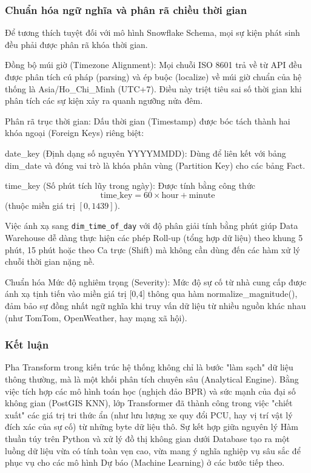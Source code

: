 \subsubsection{Chuẩn hóa ngữ nghĩa và phân rã chiều thời gian}
Để tương thích tuyệt đối với mô hình Snowflake Schema, mọi sự kiện phát sinh đều phải được phân rã khóa thời gian.


Đồng bộ múi giờ (Timezone Alignment): Mọi chuỗi ISO 8601 trả về từ API đều được phân tích cú pháp (parsing) và ép buộc (localize) về múi giờ chuẩn của hệ thống là Asia/Ho\_Chi\_Minh (UTC+7). Điều này triệt tiêu sai số thời gian khi phân tích các sự kiện xảy ra quanh ngưỡng nửa đêm.


Phân rã trục thời gian: Dấu thời gian (Timestamp) được bóc tách thành hai khóa ngoại (Foreign Keys) riêng biệt:


date\_key (Định dạng số nguyên YYYYMMDD): Dùng để liên kết với bảng dim\_date và đóng vai trò là khóa phân vùng (Partition Key) cho các bảng Fact.


time\_key (Số phút tích lũy trong ngày): Được tính bằng công thức
\[
\text{time\_key} = 60 \times \text{hour} + \text{minute}
\]
(thuộc miền giá trị \([0,1439]\)).

Việc ánh xạ sang \texttt{dim\_time\_of\_day} với độ phân giải tính bằng phút giúp Data Warehouse dễ dàng thực hiện các phép Roll-up (tổng hợp dữ liệu) theo khung 5 phút, 15 phút hoặc theo Ca trực (Shift) mà không cần dùng đến các hàm xử lý chuỗi thời gian nặng nề.

Chuẩn hóa Mức độ nghiêm trọng (Severity): Mức độ sự cố từ nhà cung cấp được ánh xạ tịnh tiến vào miền giá trị [0,4] thông qua hàm normalize\_magnitude(), đảm bảo sự đồng nhất ngữ nghĩa khi truy vấn dữ liệu từ nhiều nguồn khác nhau (như TomTom, OpenWeather, hay mạng xã hội).


\subsubsection{Kết luận}
Pha Transform trong kiến trúc hệ thống không chỉ là bước "làm sạch" dữ liệu thông thường, mà là một khối phân tích chuyên sâu (Analytical Engine). Bằng việc tích hợp các mô hình toán học (nghịch đảo BPR) và sức mạnh của đại số không gian (PostGIS KNN), lớp Transformer đã thành công trong việc "chiết xuất" các giá trị tri thức ẩn (như lưu lượng xe quy đổi PCU, hay vị trí vật lý đích xác của sự cố) từ những byte dữ liệu thô. Sự kết hợp giữa nguyên lý Hàm thuần túy trên Python và xử lý đồ thị không gian dưới Database tạo ra một luồng dữ liệu vừa có tính toàn vẹn cao, vừa mang ý nghĩa nghiệp vụ sâu sắc để phục vụ cho các mô hình Dự báo (Machine Learning) ở các bước tiếp theo.


